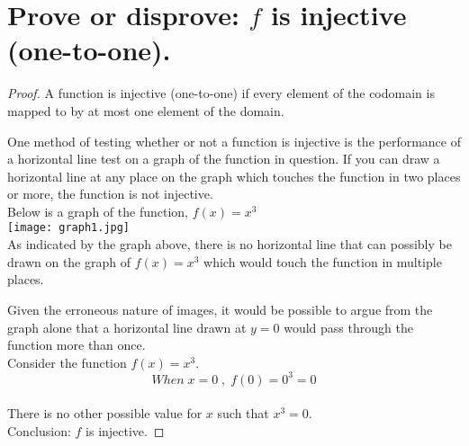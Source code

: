 \documentclass{article}
\begin{document}
\section{Prove or disprove: $f$ is injective (one-to-one).}
\begin{proof} 

A function is injective (one-to-one) if every element of the codomain is mapped to by at most one element of the domain. 

One method of testing whether or not a function is injective is the performance of a horizontal line test on a graph of the 
function in question. If you can draw a horizontal line at any place on the graph which touches the function in two places 
or more, the function is not injective. \\

Below is a graph of the function, $f(x) = x^3$ \\

\hfill\texttt{[image: graph1.jpg]}\hspace*{\fill} \\

As indicated by the graph above, there is no horizontal line that can possibly be drawn on the graph of $f(x) = x^3$ which 
would touch the function in multiple places.

Given the erroneous nature of images, it would be possible to argue from the graph alone that a horizontal line drawn at 
$y = 0$ would pass through the function more than once. \\

Consider the function $f(x) = x^3$. \\
\begin{equation}
When \; x = 0 \; , \; f(0) = 0^3 = 0
\end{equation} \\

There is no other possible value for $x$ such that $x^3 = 0$.\\

Conclusion: $f$ is injective.

\end{proof}
\end{document}
